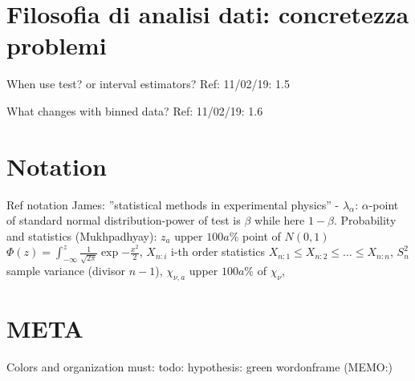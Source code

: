 \section{Filosofia di analisi dati: concretezza problemi}

\begin{frame}{When use test? or interval estimators?}\frameintoc
Ref: 11/02/19: 1.5
\end{frame}

\begin{frame}{What changes with binned data?}
Ref: 11/02/19: 1.6
\end{frame}

\section{Notation}

\begin{frame}{Ref notation}
 James: ''statistical methods in experimental physics'' - $\lambda_{\alpha}$: $\alpha$-point of standard normal distribution-power of test is $\beta$ while here $1-\beta$.
Probability and statistics (Mukhpadhyay): $z_a$ upper $100a\%$ point of $N(0,1)$ $\Phi(z)=\int_{-\infty}^z\frac{1}{\sqrt{2\pi}}\exp{-\frac{x^2}{2}}$, $X_{n:i}$ i-th order statistics $X_{n:1}\leq X_{n:2}\leq\ldots\leq X_{n:n}$, $S_n^2$ sample variance (divisor $n-1$), $\chi_{\nu,a}$ upper $100a\%$ of $\chi_{\nu}$, 
\end{frame}

\section{META}

\begin{frame}{Colors and organization}
must:
todo:
hypothesis: green
wordonframe (MEMO:)
\end{frame}